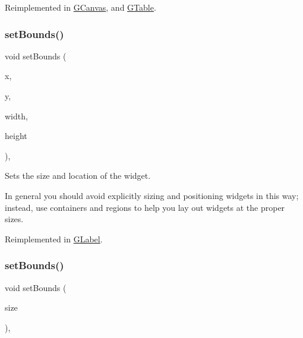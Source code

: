 Reimplemented in \mbox{\hyperlink{classGCanvas_a9cb99695b93494c7ba28268ce9e42c2a}{G\+Canvas}}, and \mbox{\hyperlink{classGTable_a9cb99695b93494c7ba28268ce9e42c2a}{G\+Table}}.

\mbox{\label{classGInteractor_a2aae8197624b72265ab83b4f1bc73f2f}} 
\subsubsection{\texorpdfstring{set\+Bounds()}{setBounds()}\hspace{0.1cm}{\footnotesize\ttfamily [1/2]}}
{\footnotesize\ttfamily void set\+Bounds (\begin{DoxyParamCaption}\item[{double}]{x,  }\item[{double}]{y,  }\item[{double}]{width,  }\item[{double}]{height }\end{DoxyParamCaption})\hspace{0.3cm}{\ttfamily [virtual]}, {\ttfamily [inherited]}}



Sets the size and location of the widget. 

In general you should avoid explicitly sizing and positioning widgets in this way; instead, use containers and regions to help you lay out widgets at the proper sizes. 

Reimplemented in \mbox{\hyperlink{classGLabel_ab9f89f193ad29d66c547cfee29ffde39}{G\+Label}}.

\mbox{\label{classGInteractor_acada386653f008cacc7cce86426bef7c}} 
\subsubsection{\texorpdfstring{set\+Bounds()}{setBounds()}\hspace{0.1cm}{\footnotesize\ttfamily [2/2]}}
{\footnotesize\ttfamily void set\+Bounds (\begin{DoxyParamCaption}\item[{const \mbox{\hyperlink{structGRectangle}{G\+Rectangle}} \&}]{size }\end{DoxyParamCaption})\hspace{0.3cm}{\ttfamily [virtual]}, {\ttfamily [inherited]}}



